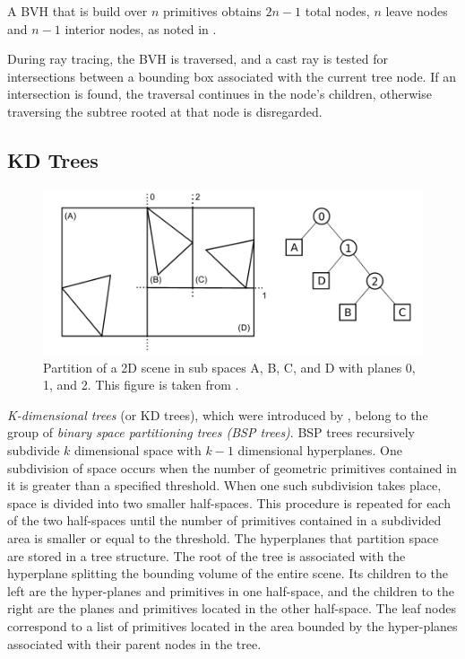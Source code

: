 A BVH that is build over $n$ primitives obtains $2n-1$ total nodes, $n$ leave nodes and $n-1$ interior nodes, as noted in \cite{pharr2016physically}.

During ray tracing, the BVH is traversed, and a cast ray is tested for intersections between a bounding box associated with the current tree node. If an intersection is found, the traversal continues in the node's children, otherwise traversing the subtree rooted at that node is disregarded.


\subsection{KD Trees}

\begin{figure}
	\centering
	\includegraphics[width=1\linewidth]{img/1 fundamentals/kd_tree.png}
	\caption{Partition of a 2D scene in sub spaces A, B, C, and D with planes 0, 1, and 2. This figure is taken from \cite{hapala2011kd}.}
	\label{fig:kdtree}
\end{figure}

\emph{K-dimensional trees} (or KD trees), which were introduced by \cite{bentley1975multidimensional}, belong to the group of \emph{binary space partitioning trees (BSP trees)}. BSP trees recursively subdivide $k$ dimensional space with $k-1$ dimensional hyperplanes. One subdivision of space occurs when the number of geometric primitives contained in it is greater than a specified threshold. When one such subdivision takes place, space is divided into two smaller half-spaces. This procedure is repeated for each of the two half-spaces until the number of primitives contained in a subdivided area is smaller or equal to the threshold. The hyperplanes that partition space are stored in a tree structure. The root of the tree is associated with the hyperplane splitting the bounding volume of the entire scene. Its children to the left are the hyper-planes and primitives in one half-space, and the children to the right are the planes and primitives located in the other half-space. The leaf nodes correspond to a list of primitives located in the area bounded by the hyper-planes associated with their parent nodes in the tree.

